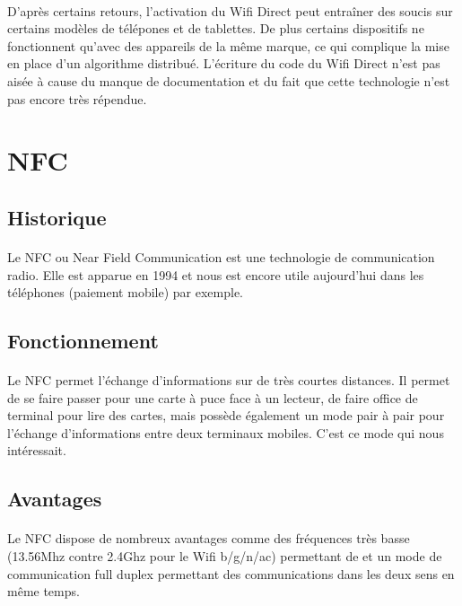 \documentclass[a4paper,10pt]{report}
\begin{document}
    \paragraph{}
    D'après certains retours, l'activation du Wifi Direct peut entraîner des soucis sur certains modèles de télépones et de tablettes. De plus certains dispositifs ne fonctionnent qu'avec des appareils de la même marque, ce qui complique la mise en place d'un algorithme distribué.
    L'écriture du code du Wifi Direct n'est pas aisée à cause du manque de documentation et du fait que cette technologie n'est pas encore très répendue.
  \section{NFC}
    \subsection{Historique}
     \paragraph{}
     Le NFC ou Near Field Communication est une technologie de communication radio. Elle est apparue en 1994 et nous est encore utile aujourd'hui dans les téléphones (paiement mobile) par exemple. 
    \subsection{Fonctionnement}
     \paragraph{}
     Le NFC permet l'échange d'informations sur de très courtes distances. Il permet de se faire passer pour une carte à puce face à un lecteur, de faire office de terminal pour lire des cartes, mais possède également un mode pair à pair pour l'échange d'informations entre deux terminaux mobiles. C'est ce mode qui nous intéressait.
    \subsection{Avantages}
    \paragraph{}
    Le NFC dispose de nombreux avantages comme des fréquences très basse (13.56Mhz contre 2.4Ghz pour le Wifi b/g/n/ac) permettant de et un mode de communication full duplex permettant des communications dans les deux sens en même temps.
\end{document}
